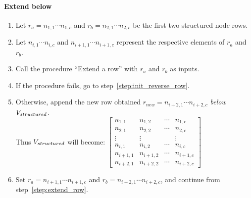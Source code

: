 \paragraph{Extend below}
\begin{enumerate}
\item Let $r_a = n_{1,1} \cdots n_{1,c}$ and $r_b = n_{2,1} \cdots n_{2,c}$ be the first two structured node rows.
\item \label{step:extend_row} Let $n_{i,1} \cdots n_{i,c}$ and $n_{i+1,1} \cdots n_{i+1,c}$ represent the respective elements of $r_a$ and $r_b$.
\item Call the procedure ``Extend a row'' with $r_a$ and $r_b$ as inputs.
\item If the procedure fails, go to step~\ref{step:init_reverse_row}.
\item Otherwise, append the new row obtained $r_{new} = n_{i+2,1} \cdots n_{i+2,c}$ \emph{below} $V_{structured}$.\\
Thus $V_{structured}$ will become:
$\begin{bmatrix}
	n_{1,1}   & n_{1,2}   & \cdots  & n_{1,c}   \\
	n_{2,1}   & n_{2,2}   & \cdots  & n_{2,c}   \\
	\vdots    & \vdots    &         & \vdots    \\
	n_{i,1}   & n_{i,2}   & \cdots  & n_{i,c}   \\
	n_{i+1,1} & n_{i+1,2} & \cdots  & n_{i+1,c} \\
	n_{i+2,1} & n_{i+2,2} & \cdots  & n_{i+2,c}
	\end{bmatrix}$
\item Set $r_a = n_{i+1,1} \cdots n_{i+1,c}$ and $r_b = n_{i+2,1} \cdots n_{i+2,c}$, and continue from step~\ref{step:extend_row}.
\end{enumerate}

